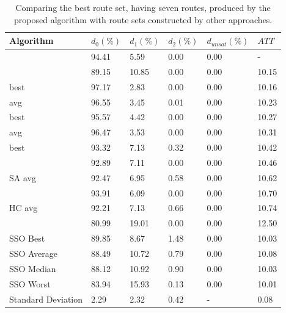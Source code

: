 \begin{table}[H]
    \centering
    \hspace*{-1.0cm}
    \begin{tabular}{|l||l|l|l|l|l|}
    \hline
    Algorithm & $d_0(\%)$ & $d_1(\%)$ & $d_2(\%)$ & $d_{unsat}(\%)$ & $ATT$ \\
    \hline
    \citet{nikolic14} & 94.41 & 5.59 & 0.00 & 0.00 & - \\
    \citet{chakroborty02} & 89.15 & 10.85 & 0.00 & 0.00 & 10.15 \\
    \citet{kechagiopoulos14} best & 97.17 & 2.83 & 0.00 & 0.00 & 10.16 \\
    \citet{kechagiopoulos14} avg & 96.55 & 3.45 & 0.01 & 0.00 & 10.23 \\
    \citet{chew12} best & 95.57 & 4.42 & 0.00 & 0.00 & 10.27 \\
    \citet{chew12} avg & 96.47 & 3.53 & 0.00 & 0.00 & 10.31 \\
    \citet{fan10} best & 93.32 & 7.13 & 0.32 & 0.00 & 10.42  \\
    \citet{zhang10} & 92.89 & 7.11 & 0.00 & 0.00 & 10.46 \\
    \citet{fan10} SA avg & 92.47 & 6.95 & 0.58 & 0.00 & 10.62 \\
    \citet{kidwai98} & 93.91 & 6.09 & 0.00 & 0.00 & 10.70 \\
    \citet{fan10} HC avg & 92.21 & 7.13 & 0.66 & 0.00 & 10.74 \\
    \citet{baaj91} & 80.99 & 19.01 & 0.00 & 0.00 & 12.50 \\
    \hline
    SSO Best & 89.85 & 8.67 & 1.48 & 0.00 & 10.03\\
    SSO Average & 88.49 & 10.72 & 0.79 & 0.00 & 10.08\\
    SSO Median & 88.12 & 10.92 & 0.90 & 0.00 & 10.03\\
    SSO Worst & 83.94 & 15.93 & 0.13 & 0.00 & 10.01\\
    Standard Deviation & 2.29 & 2.32 & 0.42 & - & 0.08\\
    \hline
    \end{tabular}
    \caption {Comparing the best route set, having seven routes, produced by the proposed algorithm with route sets constructed by other approaches.}
    \label{table:performanceComparison_7}
\end{table}
